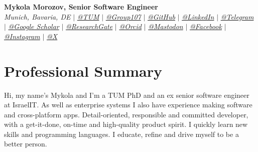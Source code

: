 \documentclass[letterpaper,10pt]{article}
\newcommand{\sectionspace}{
\vspace{-20pt}
}
\begin{document}
	

\begin{flushleft}
    \textbf{\large Mykola Morozov, Senior Software Engineer} \\    
    \textit{Munich, Bavaria, DE} $|$ 
    \href{mailto:mykola.morozov@tum.de}{{\textit{@TUM}}} $|$
    \href{mailto:mykola@group107.com}{{\textit{@Group107}}} $|$
    \href{https://github.com/mcmikecreations}{{\textit{@GitHub}}} $|$
    \href{https://www.linkedin.com/in/mykola-mor}{{\textit{@LinkedIn}}} $|$
    \href{https://t.me/mcmikecreations}{{\textit{@Telegram}}} $|$
    \href{https://scholar.google.com/citations?user=MwdhZtkAAAAJ&hl=en}{{\textit{@Google Scholar}}} $|$
    \href{https://www.researchgate.net/profile/Mykola_Morozov3}{{\textit{@ResearchGate}}} $|$
    \href{https://orcid.org/0000-0002-5892-6936}{{\textit{@Orcid}}} $|$
    \href{https://mastodon.social/@mykolamor}{{\textit{@Mastodon}}} $|$
    \href{https://www.facebook.com/mykolamor}{{\textit{@Facebook}}} $|$
    \href{https://www.instagram.com/nickolas_morozov}{{\textit{@Instagram}}} $|$
    \href{https://twitter.com/MykolaMor}{{\textit{@X}}}
    \vspace{-8pt}
\end{flushleft}
	

\section{Professional Summary}
\vspace{-3pt}
\begin{itemize}[leftmargin=0.15in, label={}]
    {\item{
     {Hi, my name's Mykola and I'm a TUM PhD and an ex senior software engineer at IsraelIT. As well as enterprise systems I also have experience making software and cross-platform apps. Detail-oriented, responsible and committed developer, with a get-it-done, on-time and high-quality product spirit. I quickly learn new skills and programming languages. I educate, refine and drive myself to be a better person.} \\      
    }}
 \end{itemize}
 \sectionspace
	
\end{document}
